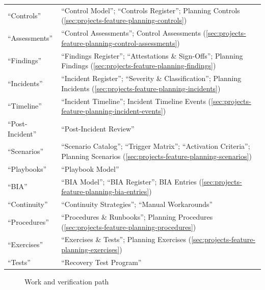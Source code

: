 \begin{table}[H]
\begin{tabularx}{\linewidth}{R{4.2cm} Y}
“Controls” & “Control Model”; “Controls Register”; Planning Controls (\ref{sec:projects-feature-planning-controls})\\
“Assessments” & “Control Assessments”; Control Assessments (\ref{sec:projects-feature-planning-control-assessments})\\
“Findings” & “Findings Register”; “Attestations \& Sign-Offs”; Planning Findings (\ref{sec:projects-feature-planning-findings})\\
“Incidents” & “Incident Register”; “Severity \& Classification”; Planning Incidents (\ref{sec:projects-feature-planning-incidents})\\
“Timeline” & “Incident Timeline”; Incident Timeline Events (\ref{sec:projects-feature-planning-incident-events})\\
“Post-Incident” & “Post-Incident Review”\\
“Scenarios” & “Scenario Catalog”; “Trigger Matrix”; “Activation Criteria”; Planning Scenarios (\ref{sec:projects-feature-planning-scenarios})\\
“Playbooks” & “Playbook Model”\\
“BIA” & “BIA Model”; “BIA Register”; BIA Entries (\ref{sec:projects-feature-planning-bia-entries})\\
“Continuity” & “Continuity Strategies”; “Manual Workarounds”\\
“Procedures” & “Procedures \& Runbooks”; Planning Procedures (\ref{sec:projects-feature-planning-procedures})\\
“Exercises” & “Exercises \& Tests”; Planning Exercises (\ref{sec:projects-feature-planning-exercises})\\
“Tests” & “Recovery Test Program”\\
\end{tabularx}
\end{table}
\begin{figure}[H]
\centering
{}
\rclegend
\caption{Work and verification path}
\label{fig:projects-plans-flow}
\end{figure}

